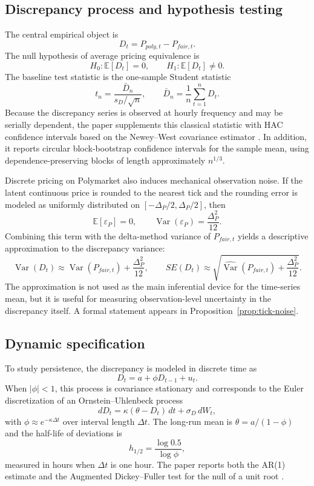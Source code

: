 \documentclass[11pt]{article}
\numberwithin{equation}{section}
\theoremstyle{plain}
\begin{document}
\subsection{Discrepancy process and hypothesis testing}
The central empirical object is
\[
D_t=P_{poly,t}-P_{fair,t}.
\]
The null hypothesis of average pricing equivalence is
\[
H_0:\mathbb{E}[D_t]=0,
\qquad
H_1:\mathbb{E}[D_t]\neq 0.
\]
The baseline test statistic is the one-sample Student statistic
\[
t_n=\frac{\bar{D}_n}{s_D/\sqrt{n}},
\qquad
\bar{D}_n=\frac{1}{n}\sum_{t=1}^n D_t.
\]
Because the discrepancy series is observed at hourly frequency and may be serially dependent, the paper supplements this classical statistic with HAC confidence intervals based on the Newey--West covariance estimator \citep{newey1987}. In addition, it reports circular block-bootstrap confidence intervals for the sample mean, using dependence-preserving blocks of length approximately $n^{1/3}$.

Discrete pricing on Polymarket also induces mechanical observation noise. If the latent continuous price is rounded to the nearest tick and the rounding error is modeled as uniformly distributed on $[-\Delta_P/2,\Delta_P/2]$, then
\[
\mathbb{E}[\varepsilon_P]=0,
\qquad
\operatorname{Var}(\varepsilon_P)=\frac{\Delta_P^2}{12}.
\]
Combining this term with the delta-method variance of $P_{fair,t}$ yields a descriptive approximation to the discrepancy variance:
\[
\operatorname{Var}(D_t)
\approx
\operatorname{Var}(P_{fair,t})+\frac{\Delta_P^2}{12},
\qquad
SE(D_t)
\approx
\sqrt{\widehat{\operatorname{Var}}(P_{fair,t})+\frac{\Delta_P^2}{12}}.
\]
The approximation is not used as the main inferential device for the time-series mean, but it is useful for measuring observation-level uncertainty in the discrepancy itself. A formal statement appears in Proposition~\ref{prop:tick-noise}.

\subsection{Dynamic specification}
To study persistence, the discrepancy is modeled in discrete time as
\[
D_t = a + \phi D_{t-1} + u_t.
\]
When $|\phi|<1$, this process is covariance stationary and corresponds to the Euler discretization of an Ornstein--Uhlenbeck process
\[
dD_t = \kappa(\theta-D_t)\,dt + \sigma_D\,dW_t,
\]
with $\phi \approx e^{-\kappa \Delta t}$ over interval length $\Delta t$. The long-run mean is $\theta=a/(1-\phi)$ and the half-life of deviations is
\[
h_{1/2}=\frac{\log 0.5}{\log \phi},
\]
measured in hours when $\Delta t$ is one hour. The paper reports both the AR(1) estimate and the Augmented Dickey--Fuller test for the null of a unit root \citep{dickey1979}.
\end{document}
